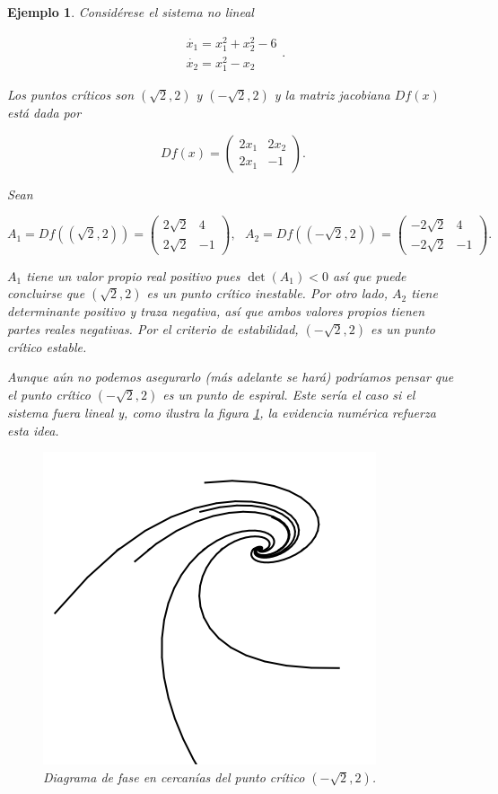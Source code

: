 \documentclass[11pt]{book}
\theoremstyle{definition}
\numberwithin{definition}{section}
\theoremstyle{theorem}
\numberwithin{theorem}{section}
\numberwithin{lemma}{section}
\numberwithin{corollary}{section}
\theoremstyle{plain}
\newtheorem{example}{Ejemplo}
\numberwithin{example}{section}
\begin{document}
\begin{example} \label{ex:nolinealhiperbolico}
Considérese el sistema no lineal

$$ \begin{array}{l} \dot{x_1} = x_1^2 + x_2^2 - 6 \\ \dot{x_2} = x_1^2 - x_2 \end{array}. $$

Los puntos críticos son $(\sqrt{2}, 2)$ y $(-\sqrt{2}, 2)$ y la matriz jacobiana $Df(x)$ está dada por

$$ Df(x) = \left( \begin{array}{ll} 2x_1 & 2x_2 \\ 2x_1 & -1 \end{array} \right).$$

Sean

$$
	A_1 = Df((\sqrt{2},2)) = \left(\begin{array}{ll} 2\sqrt{2} & 4 \\ 2\sqrt{2} & -1 \end{array} \right), \hspace{8pt}
	A_2 = Df((-\sqrt{2},2)) = \left(\begin{array}{ll} -2\sqrt{2} & 4 \\ -2\sqrt{2} & -1 \end{array} \right).	
$$

$A_1$ tiene un valor propio real positivo pues $\det(A_1) < 0$ así que puede concluirse que $(\sqrt{2}, 2)$ es un punto crítico inestable.
Por otro lado, $A_2$ tiene determinante positivo y traza negativa, así que ambos valores propios tienen partes reales negativas. Por el criterio de estabilidad, $(-\sqrt{2},2)$ es un punto crítico estable.

Aunque aún no podemos asegurarlo (más adelante se hará) podríamos pensar que el punto crítico $(-\sqrt{2}, 2)$ es un punto de espiral. Este sería el caso si el sistema fuera lineal y, como ilustra la figura \ref{fig:nolinealhiperbolico-espiral}, la evidencia numérica refuerza esta idea.

\begin{figure} \label{fig:nolinealhiperbolico-espiral} \centering
\includegraphics[scale=0.45]{figures/nolinealhiperbolico-espiral.png}
\caption{Diagrama de fase en cercanías del punto crítico $(-\sqrt{2}, 2)$.}
\end{figure}


\end{example}
\end{document}
